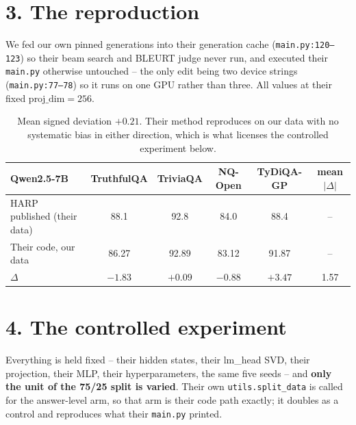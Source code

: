 \documentclass[11pt,a4paper]{article}
\begin{document}
\section*{3. The reproduction}

We fed our own pinned generations into their generation cache (\texttt{main.py:120--123}) so their
beam search and BLEURT judge never run, and executed their \texttt{main.py} otherwise untouched --
the only edit being two device strings (\texttt{main.py:77--78}) so it runs on one GPU rather than
three. All values at their fixed $\text{proj\_dim}=256$.

\begin{table}[h]
\centering\footnotesize
\begin{tabular}{lccccc}
\toprule
\textbf{Qwen2.5-7B} & \textbf{TruthfulQA} & \textbf{TriviaQA} & \textbf{NQ-Open} & \textbf{TyDiQA-GP}
& \textbf{mean $|\Delta|$} \\
\midrule
HARP published (their data) & 88.1 & 92.8 & 84.0 & 88.4 & -- \\
Their code, our data        & 86.27 & 92.89 & 83.12 & 91.87 & -- \\
\midrule
$\Delta$ & $-1.83$ & $+0.09$ & $-0.88$ & $+3.47$ & 1.57 \\
\bottomrule
\end{tabular}
\caption{Mean signed deviation $+0.21$. Their method reproduces on our data with no systematic bias
in either direction, which is what licenses the controlled experiment below.}
\end{table}

\section*{4. The controlled experiment}

Everything is held fixed -- their hidden states, their lm\_head SVD, their projection, their MLP,
their hyperparameters, the same five seeds -- and \textbf{only the unit of the 75/25 split is
varied}. Their own \texttt{utils.split\_data} is called for the answer-level arm, so that arm is
their code path exactly; it doubles as a control and reproduces what their \texttt{main.py} printed.
\end{document}

